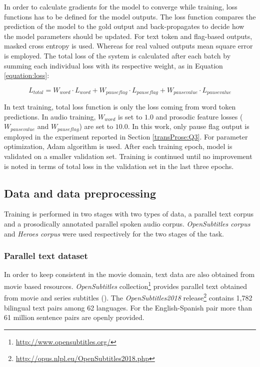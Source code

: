 In order to calculate gradients for the model to converge while training, loss functions has to be defined for the model outputs. The loss function compares the prediction of the model to the gold output and back-propagates to decide how the model parameters should be updated. For text token and flag-based outputs, masked cross entropy is used. Whereas for real valued outputs mean square error is employed. The total loss of the system is calculated after each batch by summing each individual loss with its respective weight, as in Equation \ref{equation:loss}:

\begin{equation}
    \label{equation:loss}
    { L }_{ total }= { W }_{ word }\cdot { L }_{ word }+ { W }_{ pauseflag }\cdot { L }_{ pauseflag } + { W }_{ pausevalue }\cdot { L }_{ pausevalue }
\end{equation}

In text training, total loss function is only the loss coming from word token predictions. In audio training, ${ W }_{ word }$ is set to $1.0$ and prosodic feature losses (${ W }_{ pausevalue }$ and ${ W }_{ pauseflag }$) are set to $10.0$. In this work, only pause flag output is employed in the experiment reported in Section \ref{transProse:Q3}. For parameter optimization, Adam algorithm \citep{DBLP:journals/corr/KingmaB14} is used. After each training epoch, model is validated on a smaller validation set. Training is continued until no improvement is noted in terms of total loss in the validation set in the last three epochs. 

\subsection{Data and data preprocessing}
\label{transProse:methodology:data}

Training is performed in two stages with two types of data, a parallel text corpus and a prosodically annotated parallel spoken audio corpus. \textit{OpenSubtitles corpus} and \textit{Heroes corpus} were used respectively for the two stages of the task. 

\subsubsection{Parallel text dataset}
In order to keep consistent in the movie domain, text data are also obtained from movie based resources. \textit{OpenSubtitles} collection\footnote{\url{http://www.opensubtitles.org/}} provides parallel text obtained from movie and series subtitles (\cite{Lison2016OpenSubtitles2016EL}). The \textit{OpenSubtitles2018} release\footnote{\url{http://opus.nlpl.eu/OpenSubtitles2018.php}} contains 1,782 bilingual text pairs among 62 languages. For the English-Spanish pair more than 61 million sentence pairs are openly provided. 

